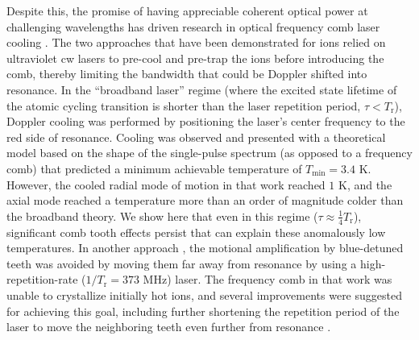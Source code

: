 \documentclass[preprint,superscriptaddress,amsmath,amssymb,aps,prl]{revtex4-1}
\begin{document}
Despite this, the promise of having appreciable coherent optical power at challenging wavelengths has driven research in optical frequency comb laser cooling \cite{Blinov2006broadband,Kielpinski2006laser,DavilaRodriguez2016doppler,Jayich2016direct}. %
 The two approaches that have been demonstrated for ions relied on ultraviolet cw lasers to pre-cool and pre-trap the ions before introducing the comb, thereby limiting the bandwidth that could be Doppler shifted into resonance. In the ``broadband laser'' regime \cite{Blinov2006broadband} (where the excited state lifetime of the atomic cycling transition is shorter than the laser repetition period, $\tau < T_\mathrm{r}$), Doppler cooling was performed by positioning the laser's center frequency to the red side of resonance.  Cooling was observed and presented with a theoretical model based on the shape of the single-pulse spectrum (as opposed to a frequency comb) that predicted a minimum achievable temperature of $T_\mathrm{min}=3.4\mbox{ K}$.  However, the cooled radial mode of motion in that work reached $1\mbox{ K}$, and the axial mode reached a temperature more than an order of magnitude colder than the broadband theory. We show here that even in this regime ($\tau \approx \frac{1}{4}T_\mathrm{r}$), significant comb tooth effects persist that can explain these anomalously low temperatures.  In another approach  \cite{DavilaRodriguez2016doppler}, the motional amplification by blue-detuned teeth was avoided by moving them far away from resonance by using a high-repetition-rate ($1/T_\mathrm{r} = 373 \mbox{ MHz} $) laser.  The frequency comb in that work was unable to crystallize initially hot ions, and several improvements were suggested for achieving this goal, including further shortening the repetition period of the laser to move the neighboring teeth even further from resonance \cite{DavilaRodriguez2016doppler}. 
\end{document}

